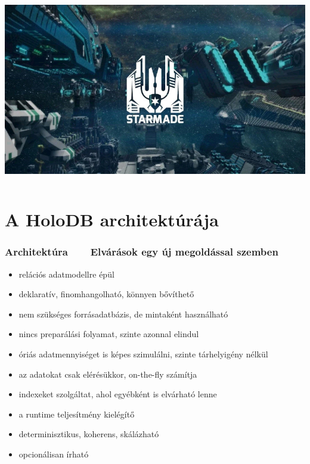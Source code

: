 \documentclass[
    aspectratio=169,
]{beamer}
\newcommand{\slidetitle}[2]{\frametitle{{\small #1 ~ \ding{226} ~ } \normalsize \textbf{#2} }}
\begin{document}
\begin{frame}[noframenumbering]
\begin{columns}[t]
    \includegraphics[width=\linewidth, frame]{image/starmade}
    \end{columns}
\end{frame}

\section{A HoloDB architektúrája}
\def\sectionshorttitle{Architektúra}

\begin{frame}
    \slidetitle{\sectionshorttitle}{Elvárások egy új megoldással szemben}
    
    \begin{itemize}
        \setlength\itemsep{0.5em}
        \item {\color{red}relációs} adatmodellre épül
        \item {\color{red}deklaratív}, finomhangolható, könnyen bővíthető
        \item nem szükséges forrásadatbázis, de mintaként használható
        \item {\color{red}nincs preparálás}i folyamat, szinte azonnal elindul
        \item óriás adatmennyiséget is képes szimulálni, szinte {\color{red}tárhelyigény nélkül}
        \item az adatokat csak elérésükkor, on-the-fly számítja
        \item indexeket szolgáltat, ahol egyébként is elvárható lenne
        \item a runtime teljesítmény kielégítő
        \item determinisztikus, {\color{red}koherens}, skálázható
        \item opcionálisan írható
    \end{itemize}
\end{frame}
\end{document}
